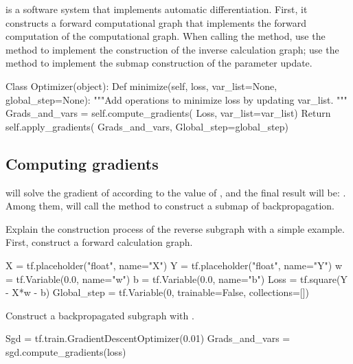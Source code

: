 \begin{content}
\tf{} is a software system that implements automatic differentiation. First, it constructs a forward computational graph that implements the forward computation of the computational graph. When calling the  method, use the  method to implement the construction of the inverse calculation graph; use the  method to implement the submap construction of the parameter update.

\begin{leftbar}
\begin{python}
Class Optimizer(object):
  Def minimize(self, loss, var_list=None, global_step=None):
    """Add operations to minimize loss by updating var_list.
    """
    Grads_and_vars = self.compute_gradients(
      Loss, var_list=var_list)
    Return self.apply_gradients(
      Grads_and_vars, 
      Global_step=global_step)
\end{python}
\end{leftbar}


\subsection{Computing gradients}
 will solve the gradient of  according to the value of , and the final result will be: . Among them,  will call the  method to construct a submap of backpropagation.

Explain the construction process of the reverse subgraph with a simple example. First, construct a forward calculation graph.

\begin{leftbar}
\begin{python}
X = tf.placeholder("float", name="X")
Y = tf.placeholder("float", name="Y")
w = tf.Variable(0.0, name="w")
b = tf.Variable(0.0, name="b")
Loss = tf.square(Y - X*w - b)
Global_step = tf.Variable(0, trainable=False, collections=[])
\end{python}
\end{leftbar}

Construct a backpropagated subgraph with .

\begin{leftbar}
\begin{python}
Sgd = tf.train.GradientDescentOptimizer(0.01)
Grads_and_vars = sgd.compute_gradients(loss)
\end{python}
\end{leftbar}



\end{content}
